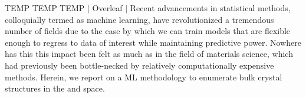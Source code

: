 TEMP TEMP TEMP | Overleaf | Recent advancements in statistical methods, colloquially termed as machine learning,
have revolutionized a tremendous number of fields due to the ease by which we can train models that are flexible enough to regress to data of interest while maintaining predictive power.
Nowhere has this this impact been felt as much as in the field of materials science,
which had previously been bottle-necked by relatively computationally expensive methods.
Herein, we report on a ML methodology to enumerate bulk crystal structures in the  and  space.


